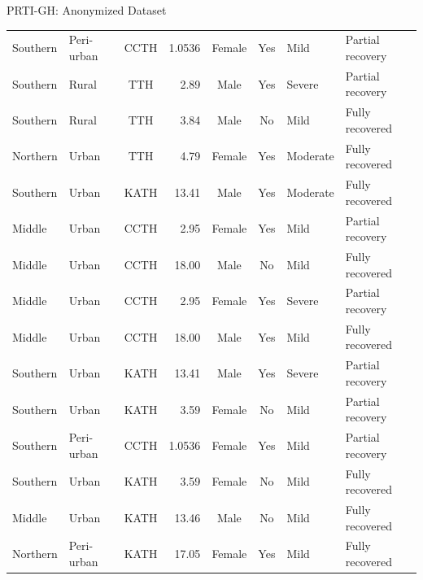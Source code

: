 \documentclass[9pt]{beamer}
\begin{document}
\begin{frame}{PRTI-GH: Anonymized Dataset}
{\begin{tabular}{l l c r c c l l}
		Southern & Peri-urban & CCTH  & 1.0536  & Female & Yes & Mild     & Partial recovery \\
			Southern &  Rural     & TTH  & 2.89  & Male   & Yes & Severe   & Partial recovery \\
			Southern & Rural      & TTH  & 3.84  & Male   & No  & Mild     & Fully recovered \\
			Northern & Urban      & TTH  & 4.79  & Female & Yes & Moderate & Fully recovered \\
			Southern & Urban      & KATH & 13.41 & Male   & Yes & Moderate & Fully recovered \\
			Middle   & Urban      & CCTH & 2.95  & Female & Yes & Mild     & Partial recovery \\
			Middle   & Urban      & CCTH & 18.00 & Male   & No  & Mild     & Fully recovered \\
			Middle   & Urban      & CCTH & 2.95  & Female & Yes & Severe   & Partial recovery \\
			Middle   & Urban      & CCTH & 18.00 & Male   & Yes & Mild     & Fully recovered \\
			Southern & Urban      & KATH & 13.41 & Male   & Yes & Severe   & Partial recovery \\
			Southern & Urban      & KATH & 3.59  & Female & No  & Mild     & Partial recovery \\
			Southern & Peri-urban & CCTH  & 1.0536  & Female & Yes & Mild     & Partial recovery \\
			Southern & Urban      & KATH & 3.59  & Female & No  & Mild     & Fully recovered \\
			Middle   & Urban      & KATH & 13.46 & Male   & No  & Mild     & Fully recovered \\
			Northern & Peri-urban & KATH & 17.05 & Female & Yes & Mild     & Fully recovered \\
			
			\bottomrule
		\end{tabular}%
	}
	
%	
\end{frame}
\end{document}
